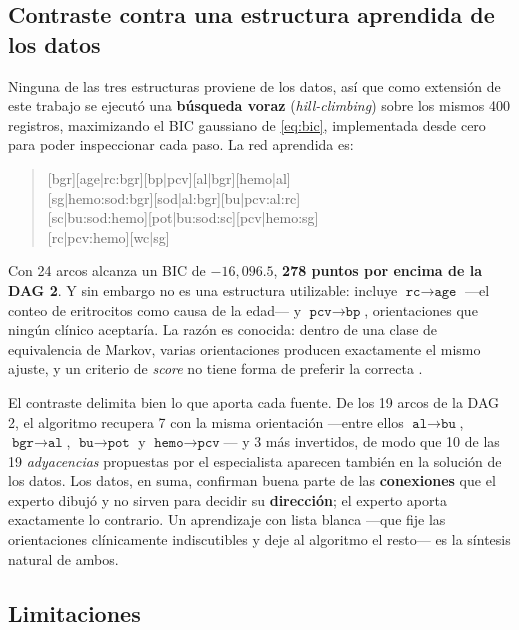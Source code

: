 \documentclass[11pt, a4paper]{article}
\begin{document}
\subsection{Contraste contra una estructura aprendida de los datos}

Ninguna de las tres estructuras proviene de los datos, así que como extensión de este trabajo se
ejecutó una \textbf{búsqueda voraz} (\textit{hill-climbing}) sobre los mismos 400 registros,
maximizando el BIC gaussiano de \eqref{eq:bic}, implementada desde cero para poder inspeccionar
cada paso. La red aprendida es:

\begin{quote}\footnotesize\ttfamily\raggedright
\mbox{[bgr][age|rc:bgr][bp|pcv][al|bgr][hemo|al]}\\
\mbox{[sg|hemo:sod:bgr][sod|al:bgr][bu|pcv:al:rc]}\\
\mbox{[sc|bu:sod:hemo][pot|bu:sod:sc][pcv|hemo:sg]}\\
\mbox{[rc|pcv:hemo][wc|sg]}
\end{quote}

Con 24 arcos alcanza un BIC de $-16{,}096.5$, \textbf{278 puntos por encima de la DAG 2}. Y sin
embargo no es una estructura utilizable: incluye $\texttt{rc} \rightarrow \texttt{age}$ —el conteo
de eritrocitos como causa de la edad— y $\texttt{pcv} \rightarrow \texttt{bp}$, orientaciones que
ningún clínico aceptaría. La razón es conocida: dentro de una clase de equivalencia de Markov,
varias orientaciones producen exactamente el mismo ajuste, y un criterio de \textit{score} no tiene
forma de preferir la correcta \cite{koller2009,chickering2002}.

El contraste delimita bien lo que aporta cada fuente. De los 19 arcos de la DAG 2, el algoritmo
recupera 7 con la misma orientación —entre ellos $\texttt{al} \rightarrow \texttt{bu}$,
$\texttt{bgr} \rightarrow \texttt{al}$, $\texttt{bu} \rightarrow \texttt{pot}$ y
$\texttt{hemo} \rightarrow \texttt{pcv}$— y 3 más invertidos, de modo que 10 de las 19
\textit{adyacencias} propuestas por el especialista aparecen también en la solución de los datos.
Los datos, en suma, confirman buena parte de las \textbf{conexiones} que el experto dibujó y no
sirven para decidir su \textbf{dirección}; el experto aporta exactamente lo contrario. Un
aprendizaje con lista blanca —que fije las orientaciones clínicamente indiscutibles y deje al
algoritmo el resto— es la síntesis natural de ambos.

\subsection{Limitaciones}
\end{document}
